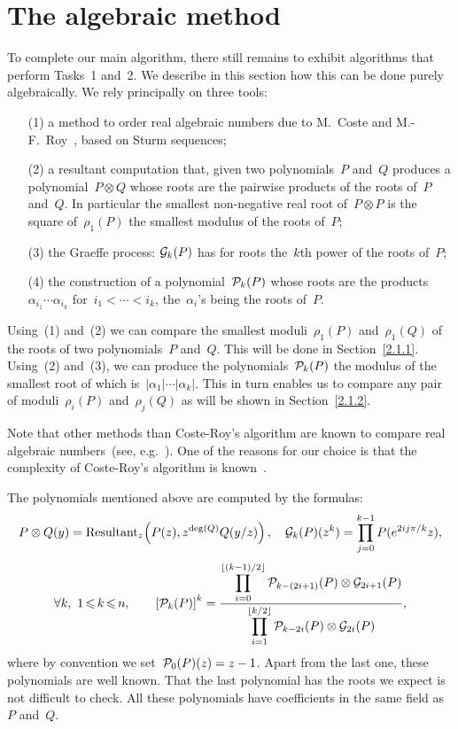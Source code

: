 \section{The algebraic method}
To complete our main algorithm, there still remains to exhibit
algorithms that perform Tasks~1 and~2. We describe in this section how
this can be done purely algebraically. We rely principally on three
tools:
\begin{itemize}

\item[(1)] a method to order real algebraic numbers due to M.~Coste
and M.-F.~Roy~\cite{CoRo88}, based on Sturm sequences;

\item[(2)] a resultant computation that, given two polynomials~$P$ and~$Q$
produces a polynomial~$P\otimes Q$ whose
roots are the pairwise products of the roots of~$P$ and~$Q$. In
particular the smallest non-negative real root of~$P\otimes P$ is the square
of~$\rho_1(P)$ the smallest modulus of the roots of~$P$;

\item[(3)] the Graeffe process: ${\cal G}_k(P)$ has for roots
the~$k$th power of the roots of~$P$;

\item[(4)] the construction of a polynomial~${\cal P}_k(P)$ whose
roots are the products~$\alpha_{i_1}\cdots\alpha_{i_k}$
for~$i_1<\cdots<i_k$, the~$\alpha_i$'s being the roots of~$P$.
\end{itemize}

Using~(1) and~(2) we can compare the smallest moduli~$\rho_1(P)$
and~$\rho_1(Q)$ of the roots of two polynomials~$P$ and~$Q$. This will
be done in Section~\ref{2.1.1}. Using~(2) and~(3), we can produce the
polynomials~${\cal P}_k(P)$ the modulus of the smallest root of which
is~$|\alpha_1|\cdots|\alpha_k|$. This in turn enables
us to compare any pair of moduli~$\rho_i(P)$ and~$\rho_j(Q)$ as will
be shown in Section~\ref{2.1.2}.

Note that other methods than Coste-Roy's algorithm are known to
compare real algebraic numbers~(see, e.g.~\cite{Rioboo92}). One of the
reasons for our choice is that the complexity of Coste-Roy's algorithm
is known~\cite{RoSz88}.

The polynomials mentioned above are computed by the formulas:
\[P\otimes Q(y)=\hbox{Resultant}_z\!\left(P(z),z^{\deg(Q)}Q(y/z)
\right),\quad
{\cal G}_k(P)(z^k)=\prod_{j=0}^{k-1} P(e^{2ij\pi/k}z),\]
\begin{equation}\label{pk}
\forall k,\ 1\leq k\leq n,\qquad \left[ {\cal P}_k(P) \right]^k = { \displaystyle{
\prod_{i=0}^{\lfloor (k-1)/2 \rfloor} {\cal P}_{k-(2i+1)}(P)
\otimes {\cal G}_{2i+1} (P)} \over \displaystyle{
\prod_{i=1}^{\lfloor k/2 \rfloor} {\cal P}_{k-2i}(P)
\otimes {\cal G}_{2i} (P)}},
\end{equation}
where by convention we set~${\cal P}_0(P)(z)=z-1$. Apart from
the last one, these polynomials are well known. That the last
polynomial has the roots we expect is not
difficult to check. All these polynomials have coefficients in the
same field as~$P$ and~$Q$.


